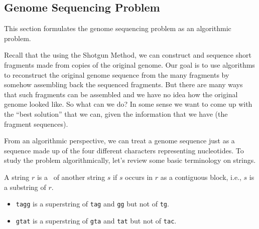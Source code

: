 
\subsection{Genome Sequencing Problem}

\begin{gram}
This section formulates the genome sequencing problem as an
algorithmic problem.
\end{gram}

\begin{gram}
Recall that the using the Shotgun Method, we can construct and sequence
short fragments made from copies of the original genome. 
%
Our goal is to use algorithms to reconstruct the original genome
sequence from the many fragments by somehow assembling back the
sequenced fragments.
%
But there are many ways that such fragments can be assembled and we
have no idea how the original genome looked like.  So what can we do?
%
In some sense we want to come up with the ``best solution'' that we
can, given the information that we have (the fragment sequences).
%
\end{gram}

\begin{gram}
From an algorithmic perspective, we can treat a genome sequence just
as a sequence made up of the four different characters representing
nucleotides.
%
To study the problem algorithmically, let's review some basic
terminology on strings.
\end{gram}

\begin{flex}
\begin{definition}[Superstring]
A string $r$ is a~ of another string $s$ if $s$
occurs in $r$ as a contiguous block, i.e., $s$ is a substring of $r$.
\end{definition}

\begin{example}
\begin{itemize}
\item
\texttt{tagg} is a superstring of \texttt{tag} and \texttt{gg} but not
of \texttt{tg}.

\item
\texttt{gtat} is a superstring of \texttt{gta} and \texttt{tat} but not
of \texttt{tac}.
 
\end{itemize}

\end{example}

\end{flex}

